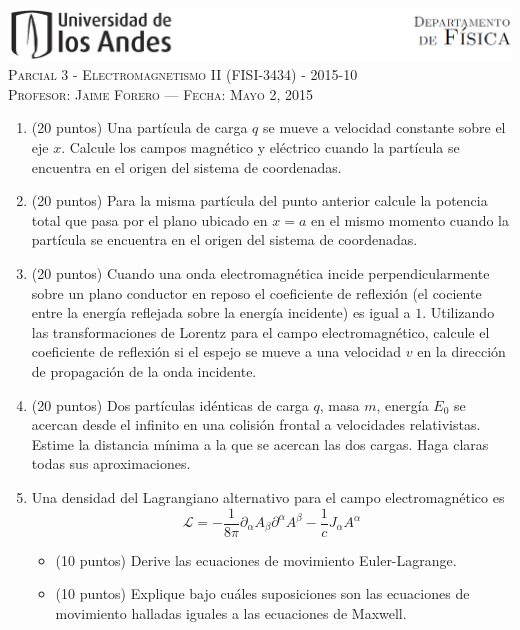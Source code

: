 \documentclass[letterpaper,10pt,onecolumn]{article}
\begin{document}
\thispagestyle{empty}
\begin{center}

\includegraphics[width=490pt]{figs/header.png}\\[0.5cm]

\textsc{\LARGE Parcial 3 - Electromagnetismo II (FISI-3434) - 2015-10}\\[0.5cm]

\textsc{\Large{Profesor: Jaime Forero --- Fecha: Mayo 2, 2015}} \\[0.5cm]
\end{center}

\begin{enumerate}

\item (20 puntos) Una part\'icula de carga $q$ se mueve a velocidad
  constante sobre el eje $x$. Calcule los campos magn\'etico y
  el\'ectrico cuando la part\'icula se encuentra en el origen del
  sistema de coordenadas.
  
\item (20 puntos) 
  Para la misma part\'icula del punto anterior
  calcule la potencia total que pasa por
  el plano ubicado en $x=a$ en el mismo momento cuando la part\'icula se
  encuentra en el origen del sistema de coordenadas.

\item (20 puntos) Cuando una onda electromagn\'etica incide
  perpendicularmente sobre un plano conductor en reposo el coeficiente
  de reflexi\'on (el cociente entre la energ\'ia reflejada sobre la
  energ\'ia incidente) es igual a $1$. Utilizando las transformaciones
  de Lorentz para el campo electromagn\'etico, calcule el coeficiente de
  reflexi\'on si el espejo se mueve a una velocidad $v$ en la
  direcci\'on de propagaci\'on de la onda incidente. 

\item (20 puntos) Dos part\'iculas id\'enticas de carga $q$, masa $m$,
  energ\'ia $E_0$ se acercan desde el infinito en una colisi\'on
  frontal a velocidades relativistas. Estime la distancia m\'inima a
  la que se acercan las dos cargas. Haga claras todas sus aproximaciones.

\item
Una densidad del Lagrangiano alternativo para el campo electromagn\'etico es
\begin{displaymath}
{\mathcal L}=-\frac{1}{8\pi}\partial_\alpha A_\beta\partial^\alpha A^{\beta} -\frac{1}{c}J_\alpha A^\alpha
\end{displaymath}
\begin{itemize}
\item (10 puntos) Derive las ecuaciones de movimiento Euler-Lagrange.
\item (10 puntos) Explique bajo cu\'ales suposiciones son las ecuaciones de
  movimiento halladas iguales a las ecuaciones de Maxwell.
\end{itemize}


\end{enumerate}
\end{document}
